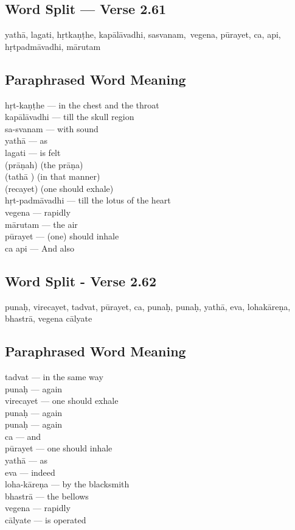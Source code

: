 \subsection*{Word Split --- Verse 2.61}

yathā, lagati, hṛtkaṇṭhe, kapālāvadhi, sasvanam, vegena, pūrayet, ca, api, hṛtpadmāvadhi, mārutam

\subsection*{Paraphrased Word Meaning}


\begin{multicols}{2}
hṛt-kaṇṭhe --- in the chest and the throat\\
kapālāvadhi --- till the skull  region\\
sa-svanam --- with sound \\
yathā --- as \\
lagati --- is felt \\
(prāṇah)  (the prāṇa)\\
(tathā ) (in that manner)\\
(recayet) (one should exhale)\\
hṛt-padmāvadhi --- till the lotus of the heart  \\
vegena --- rapidly \\
mārutam --- the air\\ 
pūrayet --- (one) should inhale \\
ca api --- And also 
\end{multicols}

\subsection*{Word Split - Verse 2.62}


punaḥ, virecayet, tadvat, pūrayet, ca, punaḥ, punaḥ,  yathā, eva, lohakāreṇa, bhastrā, vegena cālyate

\subsection*{Paraphrased Word Meaning}


\begin{multicols}{2}
tadvat  --- in the same way\\
punaḥ --- again\\
virecayet --- one should exhale\\
punaḥ --- again\\
punaḥ --- again\\
ca --- and\\
pūrayet --- one should inhale\\
yathā ---  as\\
eva --- indeed \\
loha-kāreṇa --- by the blacksmith\\
bhastrā --- the bellows\\
vegena --- rapidly\\
cālyate --- is operated
\end{multicols}

